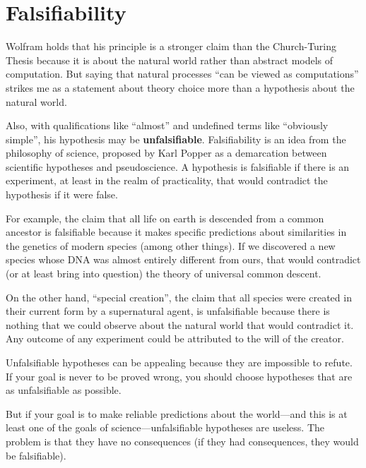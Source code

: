 \documentclass[12pt]{book}
\theoremstyle{exercise}
\begin{document}
\section{Falsifiability}

Wolfram holds that his principle is a stronger claim than the
Church-Turing Thesis because it is about the natural world rather
than abstract models of computation.  But saying that natural processes
``can be viewed as computations'' strikes me as a statement about
theory choice more than a hypothesis about the natural world.


Also, with qualifications like
``almost'' and undefined terms like ``obviously simple'', his
hypothesis may be {\bf unfalsifiable}.  Falsifiability is
an idea from the philosophy of science, proposed by Karl Popper
as a demarcation between scientific hypotheses and pseudoscience.
A hypothesis is falsifiable if there is an experiment, at least
in the realm of practicality, that would contradict the hypothesis
if it were false.


For example, the claim that all life on earth is descended
from a common ancestor is falsifiable because it makes specific
predictions about similarities in the genetics of modern species
(among other things).  If we discovered a new species whose
DNA was almost entirely different from ours, that would
contradict (or at least bring into question) the theory of
universal common descent.


On the other hand, ``special creation'', the claim that all species
were created in their current form by a supernatural agent, is
unfalsifiable because there is nothing that we could observe about the
natural world that would contradict it.  Any outcome of any experiment
could be attributed to the will of the creator.


Unfalsifiable hypotheses can be appealing because
they are impossible to refute.  If your goal is never to be
proved wrong, you should choose hypotheses that are as
unfalsifiable as possible.

But if your goal is to make reliable predictions about the world---and
this is at least one of the goals of science---unfalsifiable
hypotheses are useless.  The problem is that they have
no consequences (if they had consequences, they would be
falsifiable).
\end{document}
